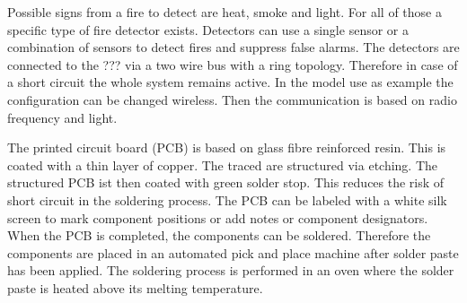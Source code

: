 Possible signs from a fire to detect are heat, smoke and light. For all of 
those a specific type of fire detector exists. Detectors can use a single 
sensor or a combination of sensors to detect fires and suppress false alarms. 
The detectors are connected to the ??? via a two wire bus with a ring 
topology. Therefore in case of a short circuit the whole system remains 
active. In the model use as example the configuration can be changed wireless. 
Then the communication is based on radio frequency and light. 

The printed circuit board (PCB) is based on glass fibre reinforced resin. This 
is coated with a thin layer of copper. The traced are structured via etching. 
The structured PCB ist then coated with green solder stop. This reduces the 
risk of short circuit in the soldering process. The PCB can be labeled with a 
white silk screen to mark component positions or add notes or component 
designators. When the PCB is completed, the components can be soldered. 
Therefore the components are placed in an automated pick and place machine 
after solder paste has been applied. The soldering process is performed in 
an oven where the solder paste is heated above its melting temperature. 
